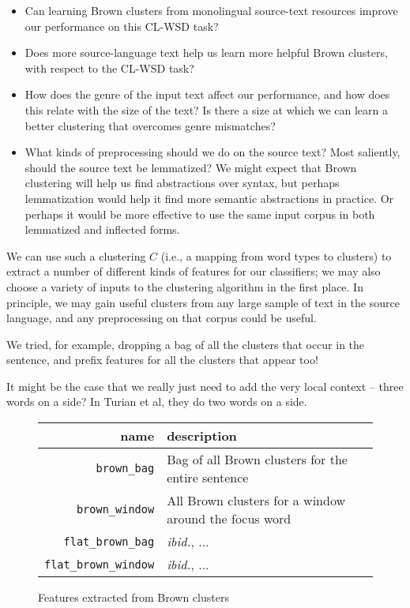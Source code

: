 \begin{itemize}
  \item Can learning Brown clusters from  monolingual source-text resources 
    improve our performance on this CL-WSD task?
  \item Does more source-language text help us learn more helpful Brown
  clusters, with respect to the CL-WSD task?
  \item How does the genre of the input text affect our performance, and how
  does this relate with the size of the text? Is there a size at which we
  can learn a better clustering that overcomes genre mismatches?
  \item What kinds of preprocessing should we do on the source text? Most
  saliently, should the source text be lemmatized? We might expect that Brown
  clustering will help us find abstractions over syntax, but perhaps
  lemmatization would help it find more semantic abstractions in practice. Or
  perhaps it would be more effective to use the same input corpus in both
  lemmatized and inflected forms.
\end{itemize}

We can use such a clustering $C$ (i.e., a mapping from word types to clusters)
to extract a number of different kinds of features for our classifiers; we may
also choose a variety of inputs to the clustering algorithm in the first place.
In principle, we may gain useful clusters from any large sample of text in the
source language, and any preprocessing on that corpus could be useful.

We tried, for example, dropping a bag of all the clusters that occur in the
sentence, and prefix features for all the clusters that appear too!

It might be the case that we really just need to add the very local context --
three words on a side? In Turian et al, they do two words on a side.

\begin{figure*}
  \begin{centering}
  \begin{tabular}{|r|p{11cm}|}
    \hline
    name          & description  \\
    \hline
    \texttt{brown\_bag}    & Bag of all Brown clusters for the entire sentence \\
    \hline
    \texttt{brown\_window}  & All Brown clusters for a window around the focus word\\
    \hline
    \texttt{flat\_brown\_bag} & \emph{ibid.}, ... \\
    \hline
    \texttt{flat\_brown\_window} & \emph{ibid.}, ... \\
    \hline
  \end{tabular}
  \end{centering}
  \caption{Features extracted from Brown clusters}
  \label{fig:brownfeatures}
\end{figure*}


